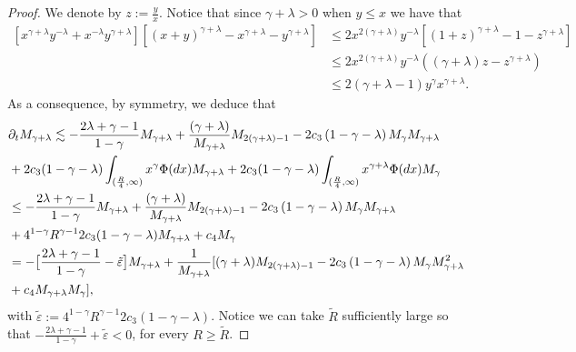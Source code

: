 \documentclass[11pt]{article}
\numberwithin{equation}{section}
\theoremstyle{plain}
\newcommand{\der}{\textup{d}}
\begin{document}
\begin{proof}
We denote by $z:=\frac{y}{x}$. Notice that since $\gamma + \lambda >0$ when $y \leq x $ we have that 
\begin{align*}
 \left[x^{\gamma + \lambda} y^{-\lambda} + x^{-\lambda} y^{\gamma + \lambda} \right] \left[ (x+y)^{\gamma + \lambda} - x^{\gamma + \lambda} - y^{\gamma + \lambda} \right]& \leq 2  x^{2(\gamma + \lambda)} y^{-\lambda} [ (1+z)^{\gamma + \lambda} - 1- z^{\gamma + \lambda}  ]\\
& \leq 2 x^{2(\gamma + \lambda)} y^{-\lambda} \left( \left(\gamma + \lambda \right)z- z^{\gamma + \lambda} \right)\\
&\leq 2 (\gamma + \lambda -1 ) y^{\gamma} x^{\gamma + \lambda}. 
\end{align*}
As a consequence, by symmetry, we deduce that 
 \begin{align} \label{epsilon appears}
&\partial_{t}M_{\gamma +\lambda}  \lesssim - \frac{2\lambda + \gamma -1 }{1-\gamma} M_{\gamma+\lambda}
+ \frac{(\gamma +\lambda)}{M_{\gamma+\lambda}}  M_{2(\gamma+\lambda)-1} - 2c_{3} \left(1-\gamma-\lambda \right)
 M_{\gamma } M_{\gamma+ \lambda}\nonumber\\
 &+2c_{3}(1-\gamma-\lambda)\int_{(\frac{R}{4},\infty)}x^{\gamma}\Phi(\der x)M_{\gamma+\lambda}+2c_{3}(1-\gamma-\lambda)\int_{(\frac{R}{4},\infty)}x^{\gamma+\lambda}\Phi(\der x)M_{\gamma}\nonumber\\
 &\leq - \frac{2\lambda + \gamma -1 }{1-\gamma} M_{\gamma+\lambda}
+ \frac{(\gamma +\lambda)}{M_{\gamma+\lambda}}  M_{2(\gamma+\lambda)-1} -2c_{3} \left(1-\gamma-\lambda \right)
 M_{\gamma } M_{\gamma+ \lambda}\nonumber\\
 &+4^{1-\gamma}R^{\gamma-1}2c_{3}(1-\gamma-\lambda)M_{\gamma+\lambda}+c_{4}M_{\gamma}\nonumber\\
 &= - \big[\frac{2\lambda + \gamma -1 }{1-\gamma}-\tilde{\varepsilon}\big]M_{\gamma+\lambda}
+ \frac{1}{M_{\gamma+\lambda}} [ (\gamma +\lambda) M_{2(\gamma+\lambda)-1} - 2c_{3} \left(1-\gamma-\lambda \right)
 M_{\gamma } M_{\gamma+ \lambda}^2\nonumber\\
 &+c_{4}M_{\gamma+\lambda}M_{\gamma}],
\end{align}
with $\tilde{\varepsilon}:=4^{1-\gamma}R^{\gamma-1}2c_{3}(1-\gamma-\lambda)$. Notice we can take $\tilde{R}$ sufficiently large so that $- \frac{2\lambda + \gamma -1 }{1-\gamma}+\tilde{\varepsilon}<0$, for every $R\geq \tilde{R}$.


\end{proof}
\end{document}
